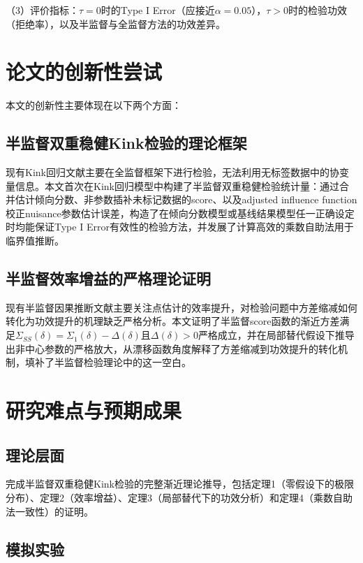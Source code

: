 \documentclass[12pt,a4paper]{ctexart}
\begin{document}
（3）评价指标：$\tau = 0$时的Type I Error（应接近$\alpha = 0.05$），$\tau > 0$时的检验功效（拒绝率），以及半监督与全监督方法的功效差异。

\section{论文的创新性尝试}

本文的创新性主要体现在以下两个方面：

\subsection{半监督双重稳健Kink检验的理论框架}

现有Kink回归文献主要在全监督框架下进行检验，无法利用无标签数据中的协变量信息。本文首次在Kink回归模型中构建了半监督双重稳健检验统计量：通过合并估计倾向分数、非参数插补未标记数据的score、以及adjusted influence function校正nuisance参数估计误差，构造了在倾向分数模型或基线结果模型任一正确设定时均能保证Type I Error有效性的检验方法，并发展了计算高效的乘数自助法用于临界值推断。

\subsection{半监督效率增益的严格理论证明}

现有半监督因果推断文献主要关注点估计的效率提升，对检验问题中方差缩减如何转化为功效提升的机理缺乏严格分析。本文证明了半监督score函数的渐近方差满足$\Sigma_{SS}(\delta) = \Sigma_1(\delta) - \Delta(\delta)$且$\Delta(\delta) > 0$严格成立，并在局部替代假设下推导出非中心参数的严格放大，从漂移函数角度解释了方差缩减到功效提升的转化机制，填补了半监督检验理论中的这一空白。

\section{研究难点与预期成果}

\subsection{理论层面}

完成半监督双重稳健Kink检验的完整渐近理论推导，包括定理1（零假设下的极限分布）、定理2（效率增益）、定理3（局部替代下的功效分析）和定理4（乘数自助法一致性）的证明。

\subsection{模拟实验}
\end{document}
